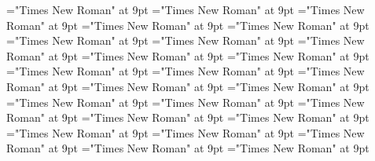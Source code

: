 \documentclass[gps1,twoside]{article}
\begin{document}
\font\spanabbreviationlocationpronunciationpronunciationssubentrysubentriesentrylastchildafter="Times New Roman" at 9pt
\font\spanspannamelocationpronunciationpronunciationssubentrysubentriesentrybefore="Times New Roman" at 9pt
\font\spannamelocationpronunciationpronunciationssubentrysubentriesentrylastchildafter="Times New Roman" at 9pt
\font\spanspanaliaslocationpronunciationpronunciationssubentrysubentriesentrybefore="Times New Roman" at 9pt
\font\spanaliaslocationpronunciationpronunciationssubentrysubentriesentrylastchildafter="Times New Roman" at 9pt
\font\spanspanvariantformentrybackrefssubentrysubentriesentrybefore="Times New Roman" at 9pt
\font\variantformentrybackrefssubentrysubentriesentrybefore="Times New Roman" at 9pt
\font\variantformentrybackrefssubentrysubentriesentryafter="Times New Roman" at 9pt
\font\variantentrytypevariantentrytypevariantentrytypesvariantformentrybackrefvariantformentrybackrefssubentrysubentriesentrybefore="Times New Roman" at 9pt
\font\variantentrytypesvariantformentrybackrefvariantformentrybackrefssubentrysubentriesentryafter="Times New Roman" at 9pt
\font\spanspanreverseabbrvariantentrytypevariantentrytypesvariantformentrybackrefvariantformentrybackrefssubentrysubentriesentrybefore="Times New Roman" at 9pt
\font\spanreverseabbrvariantentrytypevariantentrytypesvariantformentrybackrefvariantformentrybackrefssubentrysubentriesentrylastchildafter="Times New Roman" at 9pt
\font\spanspanheadwordvariantformentrybackrefvariantformentrybackrefssubentrysubentriesentrybefore="Times New Roman" at 9pt
\font\spanspanowningentrysummarydefinitionvariantformentrybackrefvariantformentrybackrefssubentrysubentriesentrybefore="Times New Roman" at 9pt
\font\spanowningentrysummarydefinitionvariantformentrybackrefvariantformentrybackrefssubentrysubentriesentrylastchildafter="Times New Roman" at 9pt
\font\etymologysubentrysubentriesentrybefore="Times New Roman" at 9pt
\font\etymologysubentrysubentriesentryafter="Times New Roman" at 9pt
\font\spanspanformetymologysubentrysubentriesentrybefore="Times New Roman" at 9pt
\font\spanformetymologysubentrysubentriesentrylastchildafter="Times New Roman" at 9pt
\font\spanspanglossetymologysubentrysubentriesentrybefore="Times New Roman" at 9pt
\font\spanglossetymologysubentrysubentriesentrylastchildafter="Times New Roman" at 9pt
\font\spanspancommentetymologysubentrysubentriesentrybefore="Times New Roman" at 9pt
\font\spancommentetymologysubentrysubentriesentrylastchildafter="Times New Roman" at 9pt
\font\spanspanminimallexreferencessubentrysubentriesentrybefore="Times New Roman" at 9pt
\font\minimallexreferencessubentrysubentriesentryafter="Times New Roman" at 9pt
\end{document}
